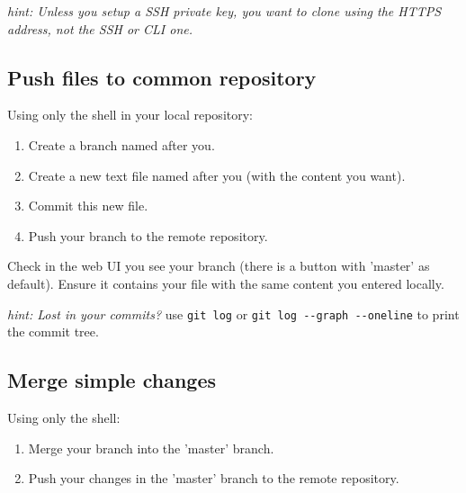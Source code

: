 \textit{hint: Unless you setup a SSH private key, you want to clone using the HTTPS address, not the SSH or CLI one.}


\subsection{Push files to common repository}  %

Using only the shell in your local repository:

\begin{enumerate}
    \item Create a branch named after you.
    \item Create a new text file named after you (with the content you want).
    \item Commit this new file.
    \item Push your branch to the remote repository.
\end{enumerate}

Check in the web UI you see your branch (there is a button with 'master' as default).
Ensure it contains your file with the same content you entered locally.


\textit{hint: Lost in your commits?} use \verb+git log+ or \verb+git log --graph --oneline+ to print the commit tree.

\subsection{Merge simple changes}  %

Using only the shell:
\begin{enumerate}
    \item Merge your branch into the 'master' branch.
    \item Push your changes in the 'master' branch to the remote repository.
\end{enumerate}

